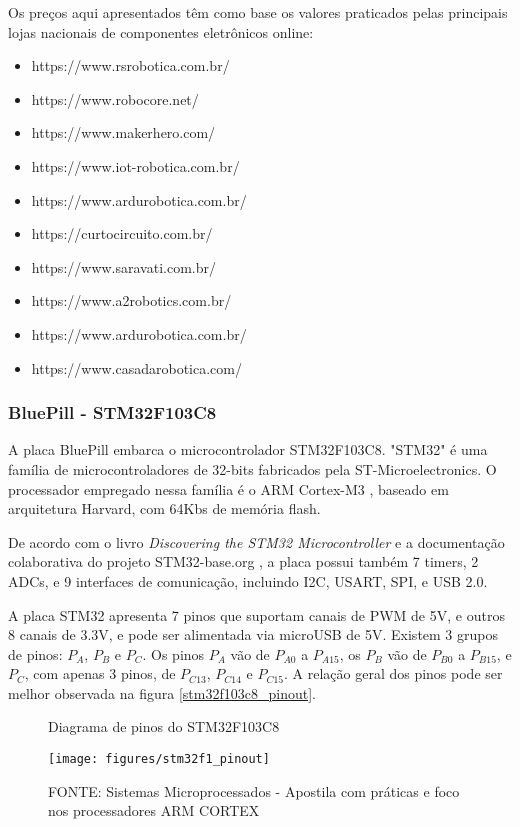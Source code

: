 Os preços aqui apresentados têm como base os valores praticados pelas principais
lojas nacionais de componentes eletrônicos online:
\begin{itemize}
	\item https://www.rsrobotica.com.br/
	\item https://www.robocore.net/
	\item https://www.makerhero.com/
	\item https://www.iot-robotica.com.br/
	\item https://www.ardurobotica.com.br/
	\item https://curtocircuito.com.br/
	\item https://www.saravati.com.br/
	\item https://www.a2robotics.com.br/
	\item https://www.ardurobotica.com.br/
	\item https://www.casadarobotica.com/
\end{itemize}



\subsubsection{BluePill - STM32F103C8} \label{STM32_referencia}

A placa BluePill embarca o microcontrolador STM32F103C8.
"STM32" é uma família de microcontroladores de 32-bits fabricados pela
ST-Microelectronics. O processador empregado nessa família é o ARM Cortex-M3
\cite{cortex_m3}, baseado em arquitetura Harvard, com 64Kbs de memória flash.

De acordo com o livro \textit{Discovering the STM32 Microcontroller}
\cite{stm_doc} e a documentação colaborativa do projeto STM32-base.org
\cite{stm32_base_org}, a placa possui também 7 timers, 2 ADCs, e 9 interfaces de
comunicação, incluindo I2C,  USART, SPI, e USB 2.0.

A placa STM32 apresenta 7 pinos que suportam canais de PWM de 5V, e outros 8
canais de 3.3V, e pode ser alimentada via microUSB de 5V. Existem 3 grupos de
pinos: $P_{A}$, $P_{B}$ e $P_{C}$. Os pinos $P_{A}$ vão de $P_{A0}$ 
a $P_{A15}$, os $P_{B}$ vão de $P_{B0}$ a $P_{B15}$, e $P_{C}$, com apenas 3
pinos, de $P_{C13}$, $P_{C14}$ e $P_{C15}$.
A relação geral dos pinos pode ser melhor observada na figura 
\autoref{stm32f103c8_pinout}.

\begin{figure}[ht]
	\centering
	\caption{Diagrama de pinos do STM32F103C8}
	\texttt{[image: figures/stm32f1\_pinout]}
	\caption*{FONTE: Sistemas Microprocessados - Apostila com práticas e foco nos processadores ARM CORTEX \cite{apostila_microprossados}}
    \label{stm32f103c8_pinout}
\end{figure}

